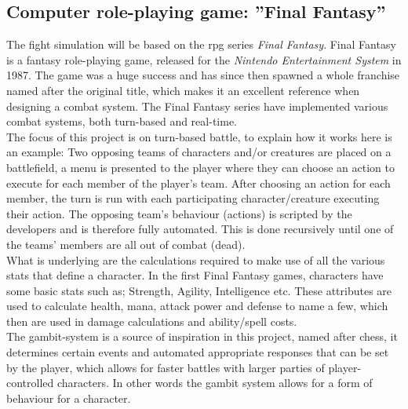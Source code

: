 

\subsection*{Computer role-playing game: ''Final Fantasy''}
The fight simulation will be based on the \ac{rpg} series \emph{Final Fantasy}. Final Fantasy is a fantasy role-playing game, released for the \emph{Nintendo Entertainment System} in 1987. The game was a huge success and has since then spawned a whole franchise named after the original title, which makes it an excellent reference when designing a combat system.
The Final Fantasy series have implemented various combat systems, both turn-based and real-time.\cite{ffantasy}\\
The focus of this project is on turn-based battle, to explain how it works here is an example: Two opposing teams of characters and/or creatures are placed on a battlefield, a menu is presented to the player where they can choose an action to execute for each member of the player's team. After choosing an action for each member, the turn is run with each participating character/creature executing their action. The opposing team's behaviour (actions) is scripted by the developers and is therefore fully automated.
This is done recursively until one of the teams' members are all out of combat (dead).\\
What is underlying are the calculations required to make use of all the various stats that define a character. In the first Final Fantasy games, characters have some basic stats such as; Strength, Agility, Intelligence etc. These attributes are used to calculate health, mana, attack power and defense to name a few, which then are used in damage calculations and ability/spell costs.\\
The gambit-system is a source of inspiration in this project, named after chess, it determines certain events and automated appropriate responses that can be set by the player, which allows for faster battles with larger parties of player-controlled characters. In other words the gambit system allows for a form of behaviour for a character.

